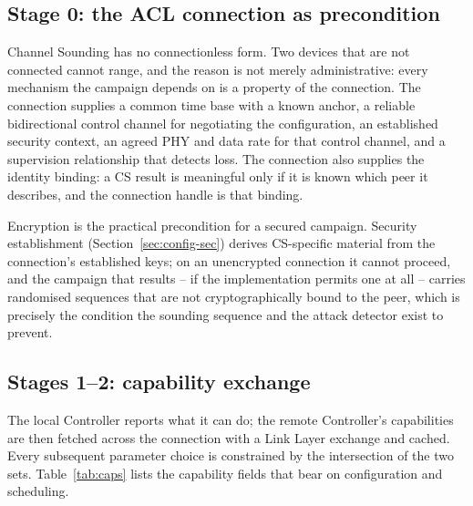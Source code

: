 \documentclass[11pt,a4paper]{article}
\begin{document}
\subsection{Stage 0: the ACL connection as precondition}

Channel Sounding has no connectionless form. Two devices that are not connected cannot range, and the
reason is not merely administrative: every mechanism the campaign depends on is a property of the
connection. The connection supplies a common time base with a known anchor, a reliable bidirectional
control channel for negotiating the configuration, an established security context, an agreed PHY and
data rate for that control channel, and a supervision relationship that detects loss. The connection
also supplies the identity binding: a CS result is meaningful only if it is known which peer it
describes, and the connection handle is that binding.

Encryption is the practical precondition for a secured campaign. Security establishment
(Section~\ref{sec:config-sec}) derives CS-specific material from the connection's established keys; on
an unencrypted connection it cannot proceed, and the campaign that results -- if the implementation
permits one at all -- carries randomised sequences that are not cryptographically bound to the peer,
which is precisely the condition the sounding sequence and the attack detector exist to prevent.

\subsection{Stages 1--2: capability exchange}

The local Controller reports what it can do; the remote Controller's capabilities are then fetched
across the connection with a Link Layer exchange and cached. Every subsequent parameter choice is
constrained by the intersection of the two sets. Table~\ref{tab:caps} lists the capability fields
that bear on configuration and scheduling.
\end{document}
